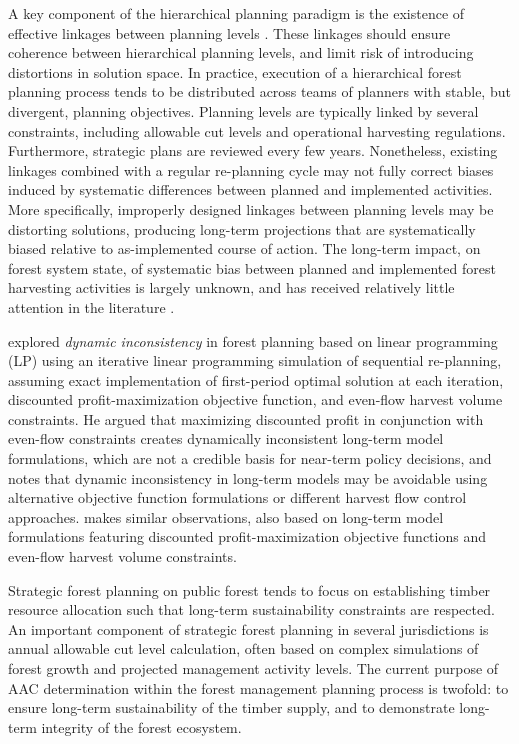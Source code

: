 A key component of the hierarchical planning paradigm is the existence of
effective linkages between planning levels \citep{bitran1977design}.
These linkages should ensure coherence between hierarchical planning
levels, and limit risk of introducing distortions in solution
space. In practice, execution of a hierarchical forest planning
process tends to be distributed across teams of planners with stable,
but divergent, planning objectives. Planning levels are typically
linked by several constraints, including allowable cut levels and
operational harvesting regulations.  Furthermore, strategic plans are
reviewed every few years. Nonetheless, existing linkages combined with a
regular re-planning cycle may not fully correct biases induced by systematic
differences between planned and implemented activities. More
specifically, improperly designed linkages between planning levels may
be distorting solutions, producing long-term projections that are
systematically biased relative to as-implemented course of
action. The long-term impact, on forest system state, of systematic bias
between planned and implemented forest harvesting activities is
largely unknown, and has received relatively little attention in the
literature
\citep{bettinger2004key,weintraub2006operations,pittman2007hierarchical}.

\citet{daugherty1991credibility} explored \emph{dynamic inconsistency}
in forest planning based on linear programming (LP) using an iterative
linear programming simulation of sequential re-planning, assuming
exact implementation of first-period optimal solution at each
iteration, discounted profit-maximization objective function, and
even-flow harvest volume constraints.  He argued that maximizing
discounted profit in conjunction with even-flow constraints creates
dynamically inconsistent long-term model formulations, which are not a
credible basis for near-term policy decisions, and notes that dynamic
inconsistency in long-term models may be avoidable using alternative
objective function formulations or different harvest flow control
approaches. \citet{mcquillan1986declining} makes similar observations,
also based on long-term model formulations featuring discounted
profit-maximization objective functions and even-flow harvest volume
constraints.

Strategic forest planning on public forest tends to focus on
establishing timber resource allocation such that long-term
sustainability constraints are respected. An important component of
strategic forest planning in several jurisdictions is annual allowable
cut level calculation, often based on complex simulations of forest
growth and projected management activity levels. The current purpose
of AAC determination within the forest management planning process is
twofold: to ensure long-term sustainability of the timber supply, and to
demonstrate long-term integrity of the forest ecosystem.

